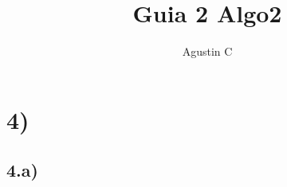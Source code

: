 \documentclass{article}
\title{Guia 2 Algo2}
\author{Agustin C}
\begin{document}
\maketitle
\section*{4)}
\subsection*{4.a)}
\end{document}
